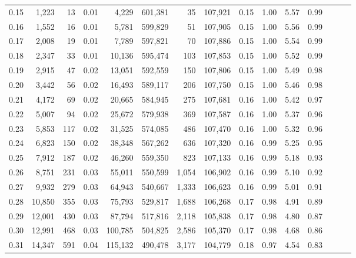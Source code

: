 \begin{tabular}{rrrrrrrrrrrrrrr}
0.15 &   1,223 &     13 &  0.01 &    4,229 &  601,381 &       35 &  107,921 &  0.15 &  1.00 &  5.57 &      0.99 \\
0.16 &   1,552 &     16 &  0.01 &    5,781 &  599,829 &       51 &  107,905 &  0.15 &  1.00 &  5.56 &      0.99 \\
0.17 &   2,008 &     19 &  0.01 &    7,789 &  597,821 &       70 &  107,886 &  0.15 &  1.00 &  5.54 &      0.99 \\
0.18 &   2,347 &     33 &  0.01 &   10,136 &  595,474 &      103 &  107,853 &  0.15 &  1.00 &  5.52 &      0.99 \\
0.19 &   2,915 &     47 &  0.02 &   13,051 &  592,559 &      150 &  107,806 &  0.15 &  1.00 &  5.49 &      0.98 \\
0.20 &   3,442 &     56 &  0.02 &   16,493 &  589,117 &      206 &  107,750 &  0.15 &  1.00 &  5.46 &      0.98 \\
0.21 &   4,172 &     69 &  0.02 &   20,665 &  584,945 &      275 &  107,681 &  0.16 &  1.00 &  5.42 &      0.97 \\
0.22 &   5,007 &     94 &  0.02 &   25,672 &  579,938 &      369 &  107,587 &  0.16 &  1.00 &  5.37 &      0.96 \\
0.23 &   5,853 &    117 &  0.02 &   31,525 &  574,085 &      486 &  107,470 &  0.16 &  1.00 &  5.32 &      0.96 \\
0.24 &   6,823 &    150 &  0.02 &   38,348 &  567,262 &      636 &  107,320 &  0.16 &  0.99 &  5.25 &      0.95 \\
0.25 &   7,912 &    187 &  0.02 &   46,260 &  559,350 &      823 &  107,133 &  0.16 &  0.99 &  5.18 &      0.93 \\
0.26 &   8,751 &    231 &  0.03 &   55,011 &  550,599 &    1,054 &  106,902 &  0.16 &  0.99 &  5.10 &      0.92 \\
0.27 &   9,932 &    279 &  0.03 &   64,943 &  540,667 &    1,333 &  106,623 &  0.16 &  0.99 &  5.01 &      0.91 \\
0.28 &  10,850 &    355 &  0.03 &   75,793 &  529,817 &    1,688 &  106,268 &  0.17 &  0.98 &  4.91 &      0.89 \\
0.29 &  12,001 &    430 &  0.03 &   87,794 &  517,816 &    2,118 &  105,838 &  0.17 &  0.98 &  4.80 &      0.87 \\
0.30 &  12,991 &    468 &  0.03 &  100,785 &  504,825 &    2,586 &  105,370 &  0.17 &  0.98 &  4.68 &      0.86 \\
0.31 &  14,347 &    591 &  0.04 &  115,132 &  490,478 &    3,177 &  104,779 &  0.18 &  0.97 &  4.54 &      0.83 \\

\end{tabular}
